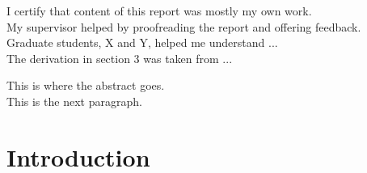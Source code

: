 \documentclass{UCreport}
\begin{document}



        
\buildmargins %
\buildcover %




\declaration

I certify that content of this report was mostly my own work.
\\

My supervisor helped by proofreading the report and offering feedback. \\

Graduate students, X and Y, helped me understand ... \\

The derivation in section 3 was taken from ... \\

\vspace{2cm}
\begin{centering}
\textbf{\student}\par
\end{centering}

\newpage



\abstract

This is where the abstract goes. \\

This is the next paragraph.


\newpage




\toc %


\listoffigures
\newpage
{}
\listoftables
\newpage





\section{Introduction}
\end{document}
